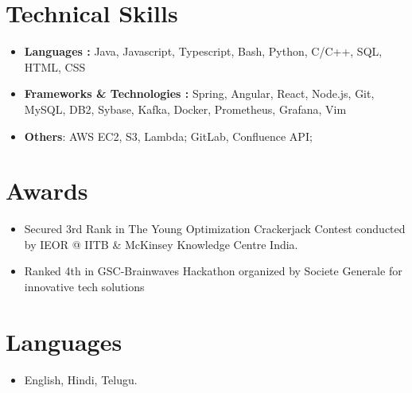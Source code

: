 \documentclass[letterpaper,11pt]{article}
\newcommand{\resumeSubHeadingListStart}{\begin{itemize}[leftmargin=*]}
\newcommand{\resumeSubHeadingListEnd}{\end{itemize}}
\begin{document}
\section{Technical Skills}
  \resumeSubHeadingListStart
    \item{ \textbf{Languages : }{Java, Javascript, Typescript, Bash, Python, C/C++, SQL, HTML, CSS} }
    \item{ \textbf{Frameworks \& Technologies : }{Spring, Angular, React, Node.js, Git, MySQL, DB2, Sybase, Kafka, Docker, Prometheus, Grafana, Vim} }
    \item{ \textbf{Others}: AWS EC2, S3, Lambda; GitLab, Confluence API; }
  \resumeSubHeadingListEnd
  
\section{Awards}
  \resumeSubHeadingListStart
    \item{ {Secured 3rd Rank in The Young Optimization Crackerjack Contest conducted by IEOR @ IITB \& McKinsey Knowledge Centre India.} }
    \item{ {Ranked 4th in GSC-Brainwaves Hackathon organized by Societe Generale for innovative tech solutions} }
  \resumeSubHeadingListEnd

\section{Languages}
  \resumeSubHeadingListStart
    \item{ {English, Hindi, Telugu.} }
  \resumeSubHeadingListEnd

\end{document}
